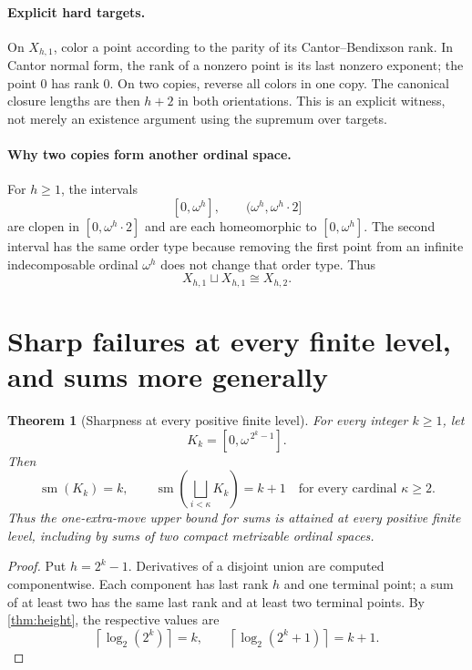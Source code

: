 \documentclass[11pt,letterpaper]{article}
\numberwithin{equation}{section}
\newtheorem{theorem}{Theorem}[section]
\theoremstyle{definition}
\theoremstyle{remark}
\newcommand{\sm}{\operatorname{sm}}
\newcommand{\ceil}[1]{\left\lceil#1\right\rceil}
\newcommand{\bigsqsum}{\bigsqcup}
\begin{document}
\paragraph{Explicit hard targets.}
On $X_{h,1}$, color a point according to the parity of its Cantor--Bendixson
rank. In Cantor normal form, the rank of a nonzero point is its last nonzero
exponent; the point $0$ has rank $0$. On two copies, reverse all colors in one
copy. The canonical closure lengths are then $h+2$ in both orientations.
This is an explicit witness, not merely an existence argument using the
supremum over targets.

\paragraph{Why two copies form another ordinal space.}
For $h\geq1$, the intervals
\[
 [0,\omega^h],\qquad (\omega^h,\omega^h\cdot2]
\]
are clopen in $[0,\omega^h\cdot2]$ and are each homeomorphic to
$[0,\omega^h]$. The second interval has the same order type because removing
the first point from an infinite indecomposable ordinal $\omega^h$ does not
change that order type. Thus
\[
 X_{h,1}\sqcup X_{h,1}\cong X_{h,2}.
\]

\section{Sharp failures at every finite level, and sums more generally}

\begin{theorem}[Sharpness at every positive finite level]\label{thm:sharp}
For every integer $k\geq1$, let
\[
 K_k=[0,\omega^{\,2^k-1}].
\]
Then
\begin{equation}\label{eq:sharp}
 \sm(K_k)=k,\qquad
 \sm\!\left(\bigsqsum_{i<\kappa}K_k\right)=k+1
 \quad\text{for every cardinal }\kappa\geq2.
\end{equation}
Thus the one-extra-move upper bound for sums is attained at every positive
finite level, including by sums of two compact metrizable ordinal spaces.
\end{theorem}
\begin{proof}
Put $h=2^k-1$. Derivatives of a disjoint union are computed componentwise.
Each component has last rank $h$ and one terminal point; a sum of at least two
has the same last rank and at least two terminal points. By
\cref{thm:height}, the respective values are
\[
 \ceil{\log_2(2^k)}=k,\qquad
 \ceil{\log_2(2^k+1)}=k+1.
\]
\end{proof}
\end{document}
